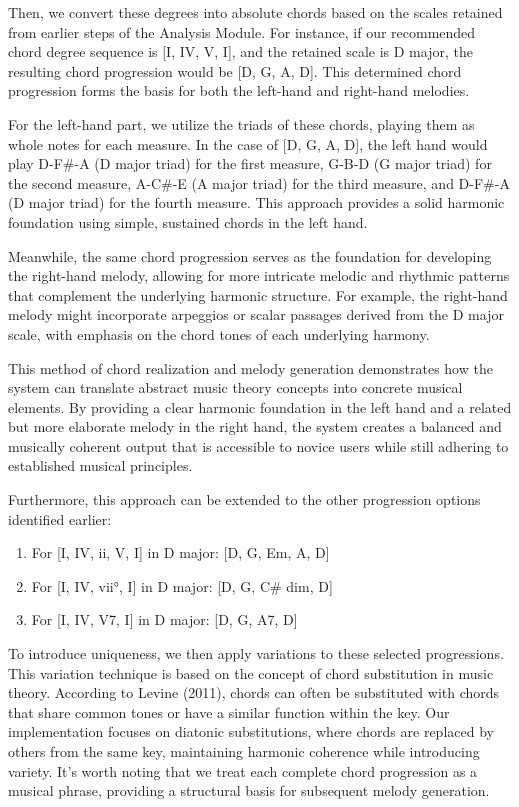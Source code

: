 Then, we convert these degrees into absolute chords based on the scales retained from earlier steps of the Analysis Module. For instance, if our recommended chord degree sequence is [I, IV, V, I], and the retained scale is D major, the resulting chord progression would be [D, G, A, D]. This determined chord progression forms the basis for both the left-hand and right-hand melodies.

For the left-hand part, we utilize the triads of these chords, playing them as whole notes for each measure. In the case of [D, G, A, D], the left hand would play D-F\#-A (D major triad) for the first measure, G-B-D (G major triad) for the second measure, A-C\#-E (A major triad) for the third measure, and D-F\#-A (D major triad) for the fourth measure. This approach provides a solid harmonic foundation using simple, sustained chords in the left hand.

Meanwhile, the same chord progression serves as the foundation for developing the right-hand melody, allowing for more intricate melodic and rhythmic patterns that complement the underlying harmonic structure. For example, the right-hand melody might incorporate arpeggios or scalar passages derived from the D major scale, with emphasis on the chord tones of each underlying harmony.

This method of chord realization and melody generation demonstrates how the system can translate abstract music theory concepts into concrete musical elements. By providing a clear harmonic foundation in the left hand and a related but more elaborate melody in the right hand, the system creates a balanced and musically coherent output that is accessible to novice users while still adhering to established musical principles.

Furthermore, this approach can be extended to the other progression options identified earlier:

\begin{enumerate}
    \item For [I, IV, ii, V, I] in D major: [D, G, Em, A, D]
    \item For [I, IV, vii°, I] in D major: [D, G, C\# dim, D]
    \item For [I, IV, V7, I] in D major: [D, G, A7, D]
\end{enumerate}


To introduce uniqueness, we then apply variations to these selected progressions. This variation technique is based on the concept of chord substitution in music theory. According to Levine (2011), chords can often be substituted with chords that share common tones or have a similar function within the key\cite{levine2011jazz}. Our implementation focuses on diatonic substitutions, where chords are replaced by others from the same key, maintaining harmonic coherence while introducing variety. It's worth noting that we treat each complete chord progression as a musical phrase, providing a structural basis for subsequent melody generation.

